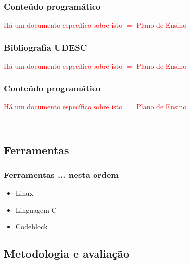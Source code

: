 \begin{frame}
\frametitle{Conteúdo programático}

   \textcolor{red}{Há um documento específico sobre isto $=$ Plano de Ensino}
    
\end{frame}


\begin{frame}
\frametitle{Bibliografia UDESC}

    \textcolor{red}{Há um documento específico sobre isto $=$ Plano de Ensino}
      
 \end{frame}


\begin{frame}
\frametitle{Conteúdo programático}

 \textcolor{red}{Há um documento específico sobre isto $=$ Plano de Ensino}

\end{frame}
---------------------------

\subsection{Ferramentas}
\begin{frame}

    \frametitle{Ferramentas ... nesta ordem}

    \begin{itemize}
          \item Linux 
      \item Linguagem C
      \item Codeblock
      

      
    \end{itemize}
\end{frame}


\subsection{Metodologia e avaliação}  

